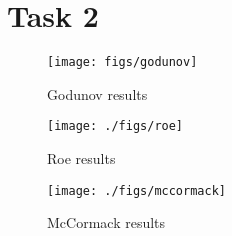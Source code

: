 \section{Task 2}
\label{app:2}
\begin{figure}[H]
    \centering
    \texttt{[image: figs/godunov]}
    \caption{Godunov results}\label{fig:godunov}
\end{figure}
\begin{figure}[H]
    \centering
    \texttt{[image: ./figs/roe]}
    \caption{Roe results}\label{fig:roe}
\end{figure}
\begin{figure}[H]
    \centering
    \texttt{[image: ./figs/mccormack]}
    \caption{McCormack results}\label{fig:mccormack}
\end{figure}

